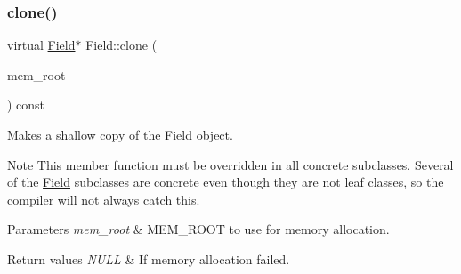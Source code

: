 \mbox{\label{classField_a64979bcb9345803b031fff76a0c3d9fe}} 
\subsubsection{\texorpdfstring{clone()}{clone()}\hspace{0.1cm}{\footnotesize\ttfamily [2/2]}}
{\footnotesize\ttfamily virtual \mbox{\hyperlink{classField}{Field}}$\ast$ Field\+::clone (\begin{DoxyParamCaption}\item[{M\+E\+M\+\_\+\+R\+O\+OT $\ast$}]{mem\+\_\+root }\end{DoxyParamCaption}) const\hspace{0.3cm}{\ttfamily [pure virtual]}}

Makes a shallow copy of the \mbox{\hyperlink{classField}{Field}} object.

\begin{DoxyNote}{Note}
This member function must be overridden in all concrete subclasses. Several of the \mbox{\hyperlink{classField}{Field}} subclasses are concrete even though they are not leaf classes, so the compiler will not always catch this.
\end{DoxyNote}

\begin{DoxyParams}{Parameters}
{\em mem\+\_\+root} & M\+E\+M\+\_\+\+R\+O\+OT to use for memory allocation. \\
\hline
\end{DoxyParams}

\begin{DoxyRetVals}{Return values}
{\em N\+U\+LL} & If memory allocation failed. \\
\hline
\end{DoxyRetVals}



